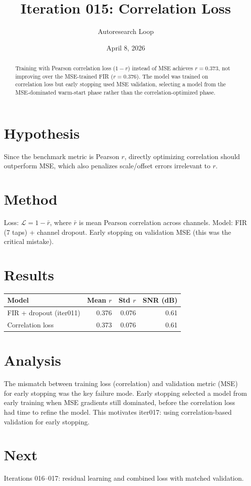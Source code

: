\documentclass[11pt,a4paper]{article}
\title{Iteration 015: Correlation Loss}
\author{Autoresearch Loop}
\date{April 8, 2026}
\begin{document}
\maketitle

\begin{abstract}
Training with Pearson correlation loss ($1-r$) instead of MSE achieves $r=0.373$,
not improving over the MSE-trained FIR ($r=0.376$). The model was trained on
correlation loss but early stopping used MSE validation, selecting a model from
the MSE-dominated warm-start phase rather than the correlation-optimized phase.
\end{abstract}

\section{Hypothesis}
Since the benchmark metric is Pearson $r$, directly optimizing correlation should
outperform MSE, which also penalizes scale/offset errors irrelevant to $r$.

\section{Method}
Loss: $\mathcal{L} = 1 - \bar{r}$, where $\bar{r}$ is mean Pearson correlation
across channels. Model: FIR (7 taps) + channel dropout. Early stopping on
validation MSE (this was the critical mistake).

\section{Results}
\begin{table}[H]
\centering
\begin{tabular}{lrrr}
\toprule
Model & Mean $r$ & Std $r$ & SNR (dB) \\
\midrule
FIR + dropout (iter011) & 0.376 & 0.076 & 0.61 \\
Correlation loss & 0.373 & 0.076 & 0.61 \\
\bottomrule
\end{tabular}
\end{table}

\section{Analysis}
The mismatch between training loss (correlation) and validation metric (MSE)
for early stopping was the key failure mode. Early stopping selected a model
from early training when MSE gradients still dominated, before the correlation
loss had time to refine the model. This motivates iter017: using correlation-based
validation for early stopping.

\section{Next}
Iterations 016--017: residual learning and combined loss with matched validation.
\end{document}
